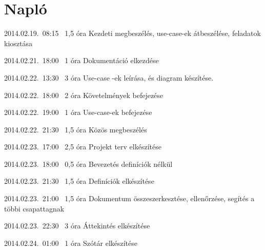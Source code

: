 %
\section{Napló}

\begin{naplo}

\bejegyzes
{2014.02.19.~08:15~}
{1,5 óra}
{\vadam\newline
\vantal\newline
\vbator\newline
\vtorok}
{Kezdeti megbeszélés, use-case-ek átbeszélése, feladatok kiosztása}

\bejegyzes
{2014.02.21.~18:00~} %
{1 óra} %
{\vantal} %
{Dokumentáció elkezdése} %

\bejegyzes
{2014.02.22.~13:30~}
{3 óra}
{\vadam}
{Use-case -ek leírása, és diagram készítése.}

\bejegyzes
{2014.02.22.~18:00~}
{2 óra}
{\vbator}
{Követelmények befejezése}

\bejegyzes
{2014.02.22.~19:00~}
{1 óra}
{\vadam}
{Use-case-ek befejezése}

\bejegyzes
{2014.02.22.~21:30~}
{1,5 óra}
{\vadam\newline
\vantal\newline
\vbator\newline
\vtorok}
{Közös megbeszélés}

\bejegyzes
{2014.02.23.~17:00~}
{2,5 óra}
{\vbator}
{Projekt terv elkészítése}

\bejegyzes
{2014.02.23.~18:00~}
{0,5 óra}
{\vantal}
{Bevezetés definíciók nélkül}

\bejegyzes
{2014.02.23.~21:30~}
{1,5 óra}
{\vantal}
{Definíciók elkészítése}

\bejegyzes
{2014.02.23.~21:00~}
{1,5 óra}
{\vbator}
{Dokumentum összeszerkesztése, ellenőrzése, segítés a többi csapattagnak}

\bejegyzes
{2014.02.23.~22:30~}
{3 óra}
{\vtorok}
{Áttekintés elkészítése}

\bejegyzes
{2014.02.24.~01:00~}
{1 óra}
{\vantal}
{Szótár elkészítése}

\end{naplo}
